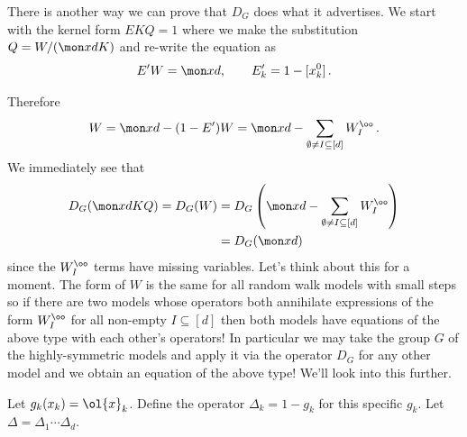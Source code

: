 \begin{example}There is another way we can prove that $D_G$ does what it advertises. We start with the kernel form $EKQ = 1$ where we make the substitution $Q = W/(\mon xd K)$ and re-write the equation as
\begin{align}
	E' W = \mon xd,\quad\quad E_k' = 1 - [x_k^0]\,.
\end{align}
\end{example}
Therefore
\begin{align}
	W = \mon xd -(1-E')W=\mon xd - \sum_{\emptyset \neq I \subseteq [d]}W_I^\oo\,.
\end{align}
We immediately see that
\begin{align}\begin{split}
	D_G(\mon xd KQ) = D_G(W) &= D_G\left(\mon xd - \sum_{\emptyset \neq I \subseteq [d]}W_I^\oo\right) \\&= D_G(\mon xd)
\end{split}\end{align}
since the $W_I^\oo$ terms have missing variables. Let's think about this for a moment. The form of $W$ is the same for all random walk models with small steps so if there are two models whose operators both annihilate expressions of the form $W_I^\oo$ for all non-empty $I\subseteq [d]$ then both models have equations of the above type with each other's operators! In particular we may take the group $G$ of the highly-symmetric models and apply it via the operator $D_G$ for any other model and we obtain an equation of the above type! We'll look into this further.
\begin{definition} Let $g_k(x_k) = \ol{x}_k$. Define the operator $\Delta_k = 1 - g_k$ for this specific $g_k$. Let $\Delta = \Delta_1\cdots \Delta_d$.
\end{definition}

